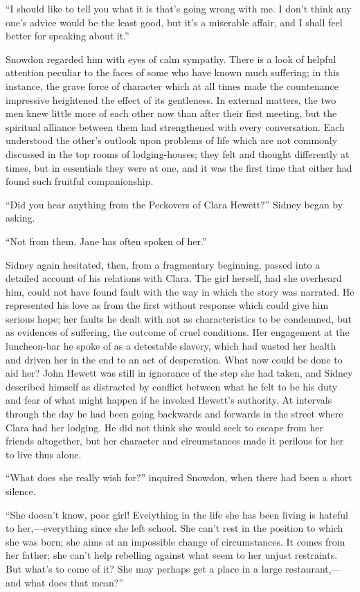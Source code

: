 ``I should like to tell you what it is that's going wrong with me. I
don't think any one's advice would be the least good, but it's {}a
miserable affair, and I shall feel better for speaking about it.''

Snowdon regarded him with eyes of calm sympathy. There is a look of
helpful attention peculiar to the faces of some who have known much
suffering; in this instance, the grave force of character which at all
times made the countenance impressive heightened the effect of its
gentleness. In external matters, the two men knew little more of each
other now than after their first meeting, but the spiritual alliance
between them had strengthened with every conversation. Each understood
the other's outlook upon problems of life which are not commonly
discussed in the top rooms of lodging-houses; they felt and thought
differently at times, but in essentials they were at one, and it was the
first time that either had found such fruitful companionship.

``Did you hear anything from the Peckovers of Clara Hewett?'' Sidney
began by asking.

``Not from them. Jane has often spoken of her.''

{}Sidney again hesitated, then, from a fragmentary beginning, passed
into a detailed account of his relations with Clara. The girl herself,
had she overheard him, could not have found fault with the way in which
the story was narrated. He represented his love as from the first
without response which could give him serious hope; her faults he dealt
with not as characteristics to be condemned, but as evidences of
suffering, the outcome of cruel conditions. Her engagement at the
luncheon-bar he spoke of as a detestable slavery, which had wasted her
health and driven her in the end to an act of desperation. What now
could be done to aid her? John Hewett was still in ignorance of the step
she had taken, and Sidney described himself as distracted by conflict
between what he felt to be his duty and fear of what might happen if he
invoked Hewett's authority. At intervals through the day he had been
going backwards and forwards in the street where Clara had her lodging.
He did not think she would seek to escape from her friends {}altogether,
but her character and circumstances made it perilous for her to live
thus alone.

``What does she really wish for?'' inquired Snowdon, when there had been
a short silence.

``She doesn't know, poor girl! Eveiything in the life she has been
living is hateful to her,---everything since she left school. She can't
rest in the position to which she was born; she aims at an impossible
change of circumstances. It comes from her father; she can't help
rebelling against what seem to her unjust restraints. But what's to come
of it? She may perhaps get a place in a large restaurant,---and what
does that mean?''

